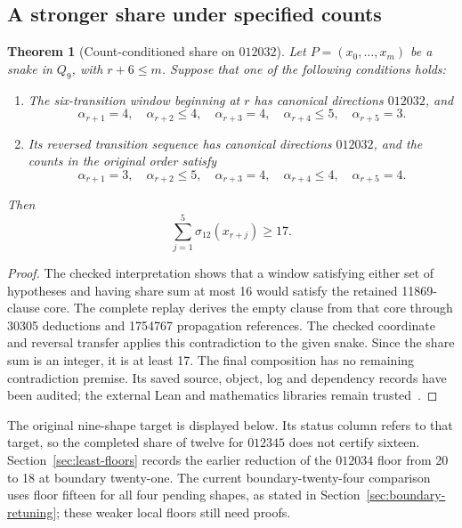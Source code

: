 \documentclass[11pt,a4paper]{article}
\newtheorem{theorem}{Theorem}[section]
\theoremstyle{definition}
\theoremstyle{remark}
\newcommand{\Q}{Q}
\begin{document}
\subsection{A stronger share under specified counts}
\begin{theorem}[Count-conditioned share on $012032$]
\label{thm:critical-count-share17}
Let $P=(x_0,\ldots,x_m)$ be a snake in $\Q_9$, with $r+6\le m$.
Suppose that one of the following conditions holds:
\begin{enumerate}
\item The six-transition window beginning at $r$ has canonical directions
$012032$, and
\[
\alpha_{r+1}=4,\quad \alpha_{r+2}\le4,\quad
\alpha_{r+3}=4,\quad \alpha_{r+4}\le5,\quad \alpha_{r+5}=3.
\]
\item Its reversed transition sequence has canonical directions $012032$,
and the counts in the original order satisfy
\[
\alpha_{r+1}=3,\quad \alpha_{r+2}\le5,\quad
\alpha_{r+3}=4,\quad \alpha_{r+4}\le4,\quad \alpha_{r+5}=4.
\]
\end{enumerate}
Then
\[
\sum_{j=1}^{5}\sigma_{12}(x_{r+j})\ge17.
\]
\end{theorem}
\begin{proof}
The checked interpretation shows that a window satisfying either set of
hypotheses and having share sum at most 16 would satisfy the retained
11869-clause core. The complete replay derives the empty clause from
that core through 30305 deductions and 1754767 propagation references.
The checked coordinate and reversal transfer applies this contradiction
to the given snake. Since the share sum is an integer, it is at least 17.
The final composition has no remaining contradiction premise. Its saved
source, object, log and dependency records have been audited; the external
Lean and mathematics libraries remain trusted~\cite{broader154archive,share155archive}.
\end{proof}
The original nine-shape target is displayed below. Its status column refers to that target, so the completed share of twelve for $012345$ does not certify sixteen. Section~\ref{sec:least-floors} records the earlier reduction of the $012034$ floor from 20 to 18 at boundary twenty-one. The current boundary-twenty-four comparison uses floor fifteen for all four pending shapes, as stated in Section~\ref{sec:boundary-retuning}; these weaker local floors still need proofs.
\end{document}
